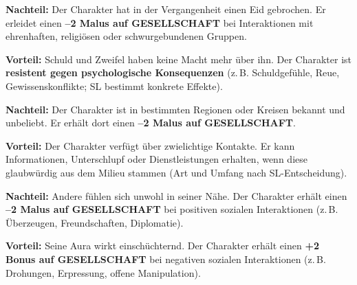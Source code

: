 \begin{traitbox}{}
	
	\textbf{Nachteil:}  
	Der Charakter hat in der Vergangenheit einen Eid gebrochen.
	Er erleidet einen \textbf{–2 Malus auf GESELLSCHAFT}
	bei Interaktionen mit ehrenhaften, religiösen oder schwurgebundenen Gruppen.
	
	\medskip
	\textbf{Vorteil:}  
	Schuld und Zweifel haben keine Macht mehr über ihn.
	Der Charakter ist \textbf{resistent gegen psychologische Konsequenzen}
	(z.\,B. Schuldgefühle, Reue, Gewissenskonflikte; SL bestimmt konkrete Effekte).
	
\end{traitbox}

\begin{traitbox}{}
	
	\textbf{Nachteil:}  
	Der Charakter ist in bestimmten Regionen oder Kreisen bekannt und unbeliebt.
	Er erhält dort einen \textbf{–2 Malus auf GESELLSCHAFT}.
	
	\medskip
	\textbf{Vorteil:}  
	Der Charakter verfügt über zwielichtige Kontakte.
	Er kann Informationen, Unterschlupf oder Dienstleistungen erhalten,
	wenn diese glaubwürdig aus dem Milieu stammen
	(Art und Umfang nach SL-Entscheidung).
	
\end{traitbox}

\begin{traitbox}{}
	
	\textbf{Nachteil:}  
	Andere fühlen sich unwohl in seiner Nähe.
	Der Charakter erhält einen \textbf{–2 Malus auf GESELLSCHAFT}
	bei positiven sozialen Interaktionen
	(z.\,B. Überzeugen, Freundschaften, Diplomatie).
	
	\medskip
	\textbf{Vorteil:}  
	Seine Aura wirkt einschüchternd.
	Der Charakter erhält einen \textbf{+2 Bonus auf GESELLSCHAFT}
	bei negativen sozialen Interaktionen
	(z.\,B. Drohungen, Erpressung, offene Manipulation).
	
\end{traitbox}


